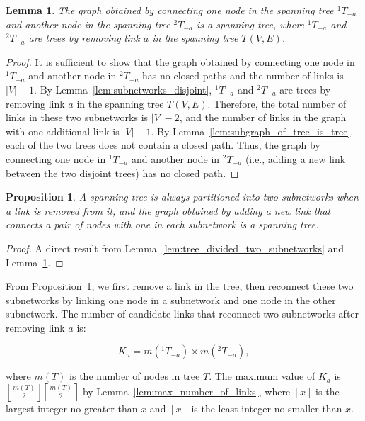 \documentclass[10pt,english]{article}
\newtheorem{proposition}[theorem]{Proposition}
\newtheorem{lemma}[theorem]{Lemma}
\begin{document}
\begin{lemma}
  The graph obtained by connecting one node in the spanning tree ${^1}T_{-a}$  and another node in the spanning tree ${^2}T_{-a}$  is a spanning tree, where ${^1}T_{-a}$  and ${^2}T_{-a}$  are trees by removing link $a$ in the spanning tree $T\left(V,E\right)$.
  \label{lem:connected_graph_is_tree}
\end{lemma}
\begin{proof}
  It is sufficient to show that the graph obtained by connecting one node in ${^1}T_{-a}$  and another node in ${^2}T_{-a}$ has no closed paths and the number of links is $|V|-1$. By Lemma~\ref{lem:subnetworks_disjoint}, ${^1}T_{-a}$ and ${^2}T_{-a}$ are trees by removing link $a$ in the spanning tree $T\left(V,E\right)$. Therefore, the total number of links in these two subnetworks is $\left|V\right|-2$, and the number of links in the graph with one additional link is $\left|V\right|-1$. By Lemma~\ref{lem:subgraph_of_tree_is_tree}, each of the two trees does not contain a closed path. Thus, the graph by connecting one node in ${^1}T_{-a}$ and another node in ${^2}T_{-a}$  (i.e., adding a new link between the two disjoint trees) has no closed path.
\end{proof}

\begin{proposition}
  A spanning tree is always partitioned into two subnetworks when a link is removed from it, and the graph obtained by adding a new link that connects a pair of nodes with one in each subnetwork is a spanning tree.
  \label{prop:swapping_procedure}
\end{proposition}
\begin{proof}
  A direct result from Lemma~\ref{lem:tree_divided_two_subnetworks} and Lemma~\ref{lem:connected_graph_is_tree}.
\end{proof}

From Proposition~\ref{prop:swapping_procedure}, we first remove a link in the tree, then reconnect these two subnetworks by linking one node in a subnetwork and one node in the other subnetwork. The number of candidate links that reconnect two subnetworks after removing link $a$ is:

\begin{equation}
K_a=m\left({^1}T_{-a}\right)\times m\left({^2}T_{-a}\right),\label{eq:number_of_links_to_reconnect_subnetworks}
\end{equation}

where $m\left(T\right)$ is the number of nodes in tree $T$. The maximum value of $K_a$ is $\left\lfloor\frac{m\left(T\right)}{2}\right\rfloor\left\lceil\frac{m\left(T\right)}{2}\right\rceil$ by Lemma~\ref{lem:max_number_of_links}, where $\left\lfloor x\right\rfloor$ is the largest integer no greater than $x$ and $\left\lceil x\right\rceil$ is the least integer no smaller than $x$.
\end{document}
